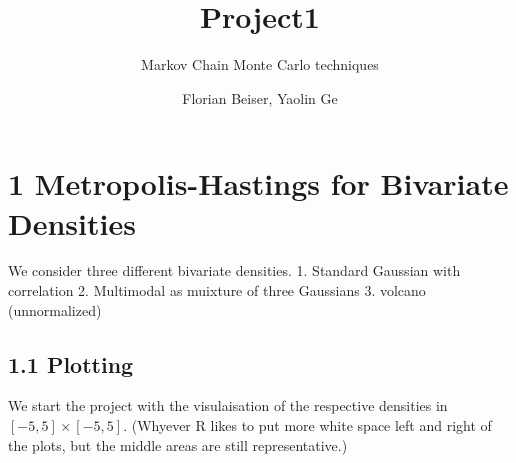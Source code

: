 \documentclass[
]{article}
\title{Project1}
\subtitle{Markov Chain Monte Carlo techniques}
\author{Florian Beiser, Yaolin Ge}
\date{}
\begin{document}
\maketitle

\hypertarget{metropolis-hastings-for-bivariate-densities}{%
\section{1 Metropolis-Hastings for Bivariate
Densities}\label{metropolis-hastings-for-bivariate-densities}}

We consider three different bivariate densities. 1. Standard Gaussian
with correlation 2. Multimodal as muixture of three Gaussians 3. volcano
(unnormalized)

\hypertarget{plotting}{%
\subsection{1.1 Plotting}\label{plotting}}

We start the project with the visulaisation of the respective densities
in \([-5,5]\times[-5,5]\). (Whyever R likes to put more white space left
and right of the plots, but the middle areas are still representative.)
\end{document}
